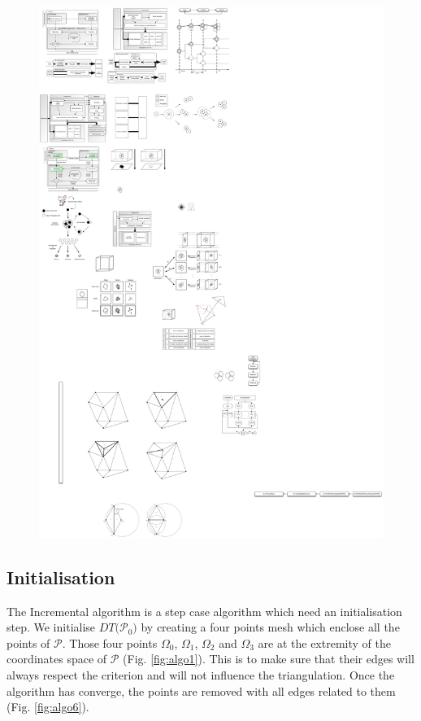 \documentclass{InsightArticle}
\begin{document}
\begin{figure}
\center
\includegraphics[width=\textwidth]{inheritance}
\label{fig:inheritance}
\end{figure}

\subsection{Initialisation}

The Incremental algorithm is a step case algorithm which need an initialisation step. We initialise $\mathit{DT(}\mathcal{P}_{0}\mathit{)}$ by creating a four points mesh which enclose all the points of $\mathcal{P}$. Those four points $\Omega_{0}$, $\Omega_{1}$, $\Omega_{2}$ and $\Omega_{3}$ are at the extremity of the coordinates space of $\mathcal{P}$ (Fig. \ref{fig:algo1}). This is to make sure that their edges will always respect the criterion and will not influence the triangulation. Once the algorithm has converge, the points are removed with all edges related to them (Fig. \ref{fig:algo6}).
\end{document}
